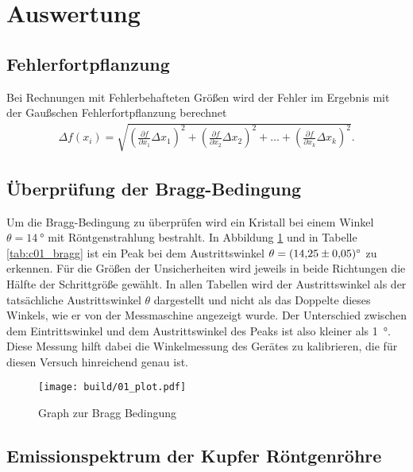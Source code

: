 \section{Auswertung}
\subsection{Fehlerfortpflanzung}
Bei Rechnungen mit Fehlerbehafteten Größen wird der Fehler im Ergebnis mit der Gaußschen Fehlerfortpflanzung berechnet
\begin{align}
    \Delta f(x_i) = \sqrt{
    \left(\frac{\partial f}{\partial x_1} \Delta x_1\right)^2%
     + \left(\frac{\partial f}{\partial x_2} \Delta x_2\right)^2%
     + \dots%
     + \left(\frac{\partial f}{\partial x_k} \Delta x_k\right)^2%
    }.
    \label{eq:gauss}
\end{align}
\subsection{Überprüfung der Bragg-Bedingung}
Um die Bragg-Bedingung zu überprüfen wird ein Kristall bei einem Winkel $\theta = \qty{14}{\degree}$ mit Röntgenstrahlung bestrahlt.
In Abbildung \ref{fig:01} und in Tabelle \ref{tab:c01_bragg} ist ein Peak bei dem Austrittswinkel $\theta= \qty{14.25+-0.05}{\degree}$
zu erkennen. 
Für die Größen der Unsicherheiten wird jeweils in beide Richtungen die Hälfte der Schrittgröße gewählt.
In allen Tabellen wird der Austrittswinkel als der tatsächliche Austrittswinkel $\theta$ dargestellt und nicht als das 
Doppelte dieses Winkels, wie er von der Messmaschine angezeigt wurde.
Der Unterschied zwischen dem Eintrittswinkel und dem Austrittswinkel des Peaks ist also kleiner als \qty{1}{\degree}.
Diese Messung hilft dabei die Winkelmessung des Gerätes zu kalibrieren, die für diesen Versuch hinreichend genau ist.
\begin{figure}
    \centering
    \texttt{[image: build/01\_plot.pdf]}
    \caption{Graph zur Bragg Bedingung}
    \label{fig:01}
\end{figure}

\subsection{Emissionspektrum der Kupfer Röntgenröhre}

